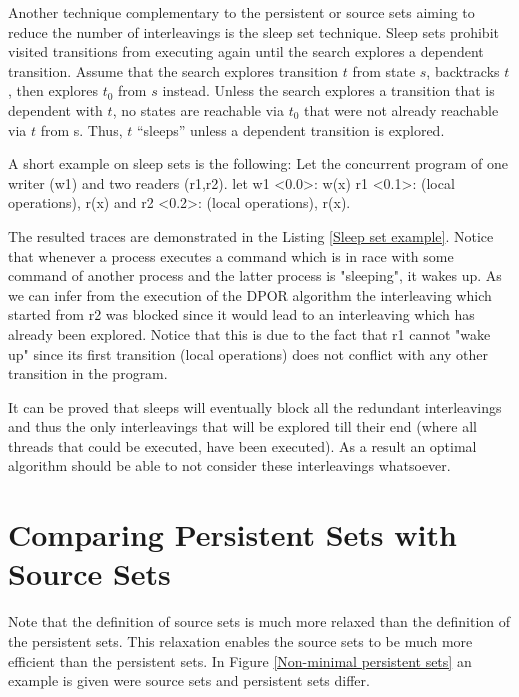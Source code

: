 Another technique complementary to the persistent or source sets aiming to reduce the number of interleavings is the sleep set technique.
Sleep sets prohibit visited transitions from executing again
until the search explores a dependent transition. Assume that
the search explores transition $t$ from state $s$, backtracks $t$,
then explores $t_0$ from $s$ instead. Unless the search explores
a transition that is dependent with $t$, no states are reachable
via $t_0$ that were not already reachable via $t$ from s. Thus, $t$
“sleeps” unless a dependent transition is explored.

A short example on sleep sets is the following:
Let the concurrent program of one writer (w1) and two readers (r1,r2).
let w1 <0.0>: w(x) r1 <0.1>: (local operations), r(x) and r2 <0.2>: (local operations), r(x).

The resulted traces are demonstrated in the Listing \ref{Sleep set example}. Notice that whenever a process executes a command 
which is in race with some command of another process and the latter process is "sleeping", it wakes up. 
As we can infer from the execution of the DPOR algorithm the interleaving which started from r2 was blocked since it would lead to an interleaving which
has already been explored. Notice that this is due to the fact that r1 cannot "wake up" since its first transition (local operations) does not conflict with any other transition
in the program. 

It can be proved \cite{Godefroid1996} that sleeps will eventually block all the redundant interleavings and thus the only interleavings that will be explored till their end (where all threads that could be executed, have been executed).
As a result an optimal algorithm should be able to not consider these interleavings whatsoever.


\section{Comparing Persistent Sets with Source Sets}

Note that the definition of source sets is much more relaxed than the definition of the persistent sets. 
This relaxation enables the source sets to be much more efficient than the persistent sets. In Figure \ref{Non-minimal persistent sets}
an example is given were source sets and persistent sets differ.

